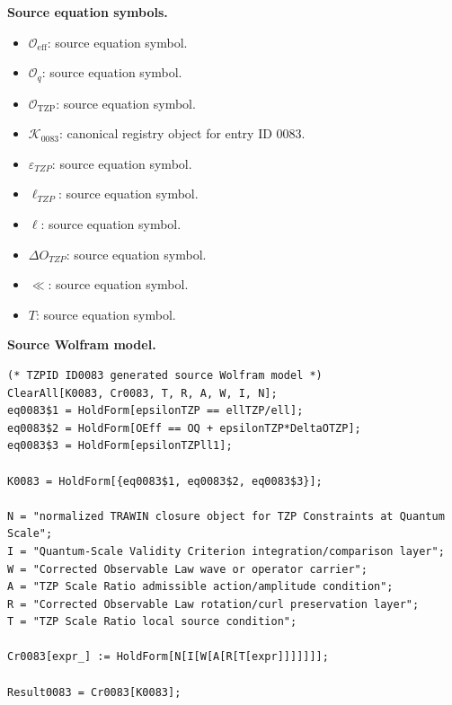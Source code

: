 \begin{minipage}[t]{0.49\linewidth}
\begingroup
\small
\raggedright
\textbf{Source equation symbols.}\par
\begin{itemize}[leftmargin=1.35em,itemsep=1pt,topsep=1pt,parsep=0pt]
    \item $\mathcal{O}_{\mathrm{eff}}$: source equation symbol.
    \item $\mathcal{O}_{q}$: source equation symbol.
    \item $\mathcal{O}_{\mathrm{TZP}}$: source equation symbol.
    \item $\mathcal{K}_{0083}$: canonical registry object for entry ID 0083.
    \item $\varepsilon_{TZP}$: source equation symbol.
    \item $\ell_{TZP}$: source equation symbol.
    \item $\ell$: source equation symbol.
    \item $\Delta O_{TZP}$: source equation symbol.
    \item $\ll$: source equation symbol.
    \item $T$: source equation symbol.
\end{itemize}
\endgroup
\end{minipage}\hfill
\begin{minipage}[t]{0.47\linewidth}
\begingroup
\scriptsize
\raggedright
\textbf{Source Wolfram model.}\par
\begin{Verbatim}[fontsize=\tiny,breaklines=true,breakanywhere=true]
(* TZPID ID0083 generated source Wolfram model *)
ClearAll[K0083, Cr0083, T, R, A, W, I, N];
eq0083$1 = HoldForm[epsilonTZP == ellTZP/ell];
eq0083$2 = HoldForm[OEff == OQ + epsilonTZP*DeltaOTZP];
eq0083$3 = HoldForm[epsilonTZPll1];

K0083 = HoldForm[{eq0083$1, eq0083$2, eq0083$3}];

N = "normalized TRAWIN closure object for TZP Constraints at Quantum Scale";
I = "Quantum-Scale Validity Criterion integration/comparison layer";
W = "Corrected Observable Law wave or operator carrier";
A = "TZP Scale Ratio admissible action/amplitude condition";
R = "Corrected Observable Law rotation/curl preservation layer";
T = "TZP Scale Ratio local source condition";

Cr0083[expr_] := HoldForm[N[I[W[A[R[T[expr]]]]]]];

Result0083 = Cr0083[K0083];
\end{Verbatim}
\endgroup
\end{minipage}

